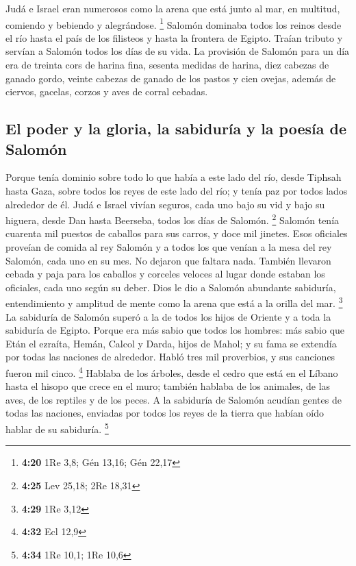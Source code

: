  Judá e Israel eran numerosos como la arena que está
junto al mar, en multitud, comiendo y bebiendo y alegrándose.
\footnote{\textbf{4:20} 1Re 3,8; Gén 13,16; Gén 22,17} 
Salomón dominaba todos los reinos desde el río hasta el país de los
filisteos y hasta la frontera de Egipto. Traían tributo y servían a
Salomón todos los días de su vida.  La provisión de
Salomón para un día era de treinta cors de harina fina, sesenta medidas
de harina,  diez cabezas de ganado gordo, veinte cabezas
de ganado de los pastos y cien ovejas, además de ciervos, gacelas,
corzos y aves de corral cebadas.

\hypertarget{el-poder-y-la-gloria-la-sabiduruxeda-y-la-poesuxeda-de-salomuxf3n}{%
\subsection{El poder y la gloria, la sabiduría y la poesía de
Salomón}\label{el-poder-y-la-gloria-la-sabiduruxeda-y-la-poesuxeda-de-salomuxf3n}}

 Porque tenía dominio sobre todo lo que había a este lado
del río, desde Tiphsah hasta Gaza, sobre todos los reyes de este lado
del río; y tenía paz por todos lados alrededor de él. 
Judá e Israel vivían seguros, cada uno bajo su vid y bajo su higuera,
desde Dan hasta Beerseba, todos los días de Salomón. \footnote{\textbf{4:25}
  Lev 25,18; 2Re 18,31}  Salomón tenía cuarenta mil
puestos de caballos para sus carros, y doce mil jinetes. 
Esos oficiales proveían de comida al rey Salomón y a todos los que
venían a la mesa del rey Salomón, cada uno en su mes. No dejaron que
faltara nada.  También llevaron cebada y paja para los
caballos y corceles veloces al lugar donde estaban los oficiales, cada
uno según su deber.  Dios le dio a Salomón abundante
sabiduría, entendimiento y amplitud de mente como la arena que está a la
orilla del mar. \footnote{\textbf{4:29} 1Re 3,12}  La
sabiduría de Salomón superó a la de todos los hijos de Oriente y a toda
la sabiduría de Egipto.  Porque era más sabio que todos
los hombres: más sabio que Etán el ezraíta, Hemán, Calcol y Darda, hijos
de Mahol; y su fama se extendía por todas las naciones de alrededor.
 Habló tres mil proverbios, y sus canciones fueron mil
cinco. \footnote{\textbf{4:32} Ecl 12,9}  Hablaba de los
árboles, desde el cedro que está en el Líbano hasta el hisopo que crece
en el muro; también hablaba de los animales, de las aves, de los
reptiles y de los peces.  A la sabiduría de Salomón
acudían gentes de todas las naciones, enviadas por todos los reyes de la
tierra que habían oído hablar de su sabiduría. \footnote{\textbf{4:34}
  1Re 10,1; 1Re 10,6}

